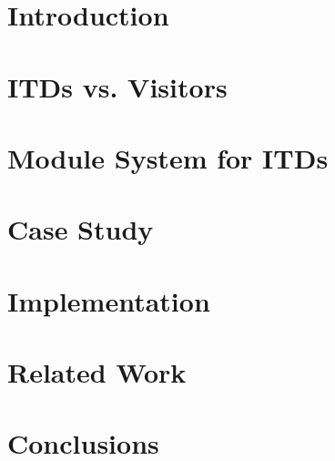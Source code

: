 \documentclass{acm_proc_article-sp}
\begin{document}

\maketitle




\section{Introduction}
\label{section:introduction}


\section{ITDs vs. Visitors}
\label{section:itdvisitors}


\section{Module System for ITDs}
\label{section:jastaddmodules}


\section{Case Study}
\label{section:casestudy}


\section{Implementation}
\label{section:implementation}


\section{Related Work}
\label{section:related}


\section{Conclusions}
\label{section:conclusions}


%

%

%
%
\end{document}
